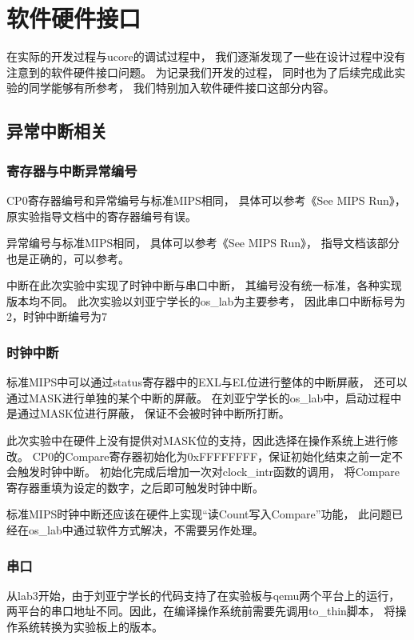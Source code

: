 \section{软件硬件接口}
    在实际的开发过程与ucore的调试过程中，
    我们逐渐发现了一些在设计过程中没有注意到的软件硬件接口问题。
    为记录我们开发的过程，
    同时也为了后续完成此实验的同学能够有所参考，
    我们特别加入软件硬件接口这部分内容。

    \subsection{异常中断相关}
        \subsubsection{寄存器与中断异常编号}
            CP0寄存器编号和异常编号与标准MIPS相同，
            具体可以参考《See MIPS Run》，
            原实验指导文档中的寄存器编号有误。

            异常编号与标准MIPS相同，
            具体可以参考《See MIPS Run》，
            指导文档该部分也是正确的，可以参考。

            中断在此次实验中实现了时钟中断与串口中断，
            其编号没有统一标准，各种实现版本均不同。
            此次实验以刘亚宁学长的os\_lab为主要参考，
            因此串口中断标号为2，时钟中断编号为7

        \subsubsection{时钟中断}
            标准MIPS中可以通过status寄存器中的EXL与EL位进行整体的中断屏蔽，
            还可以通过MASK进行单独的某个中断的屏蔽。
            在刘亚宁学长的os\_lab中，启动过程中是通过MASK位进行屏蔽，
            保证不会被时钟中断所打断。

            此次实验中在硬件上没有提供对MASK位的支持，因此选择在操作系统上进行修改。
            CP0的Compare寄存器初始化为0xFFFFFFFF，保证初始化结束之前一定不会触发时钟中断。
            初始化完成后增加一次对clock\_intr函数的调用，
            将Compare寄存器重填为设定的数字，之后即可触发时钟中断。

            标准MIPS时钟中断还应该在硬件上实现“读Count写入Compare”功能，
            此问题已经在os_lab中通过软件方式解决，不需要另作处理。

        \subsubsection{串口}
            从lab3开始，由于刘亚宁学长的代码支持了在实验板与qemu两个平台上的运行，
            两平台的串口地址不同。因此，在编译操作系统前需要先调用to\_thin脚本，
            将操作系统转换为实验板上的版本。

